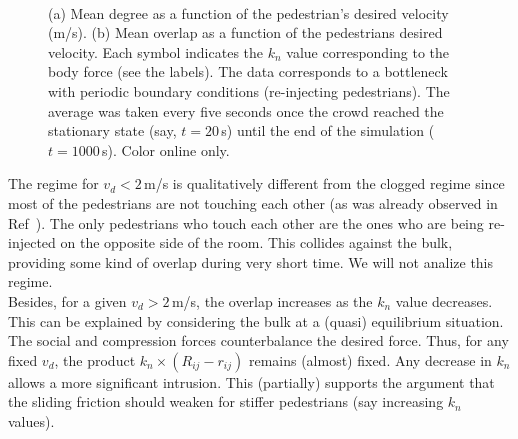 \documentclass[preprint,12pt]{elsarticle}
\begin{document}
\begin{figure}[!htbp]
\centering
    \ 
    \\
\caption[width=0.47\columnwidth]{(a) Mean degree as a function of the pedestrian’s desired velocity (m/s). (b) Mean overlap as a function of the pedestrians desired velocity. Each symbol indicates the $k_n$ value corresponding to the body force (see the labels). The data corresponds to a bottleneck with periodic boundary conditions (re-injecting pedestrians). The average was taken every five seconds once the crowd reached the stationary state (say, $t=20\,$s) until the end of the simulation ($t=1000\,$s). Color online only.}
\label{degree_overlap_vd}
\end{figure}

The regime for $v_d<2\,$m/s is qualitatively different from the clogged regime since most of the 
pedestrians are not touching each other (as was already observed in Ref~\cite{dorso_2005,dorso_2011}). The only pedestrians who touch each 
other are the ones who are being re-injected on the opposite side of the room.
This collides against the bulk, providing some kind of overlap during very short time. We will
not analize this regime.\\

Besides, for a given $v_d>2\,$m/s, the overlap increases as the $k_n$ value decreases. 
This can be explained by considering the bulk at a (quasi) equilibrium situation. 
The social and compression forces counterbalance the desired force. Thus, for any fixed $v_d$,
the product $k_n \times (R_{ij}-r_{ij})$ remains (almost) fixed. Any decrease in $k_n$
allows a more significant intrusion. This (partially) supports the argument that
the sliding friction should weaken for stiffer pedestrians (say increasing
$k_n$ values). \\  
\end{document}
